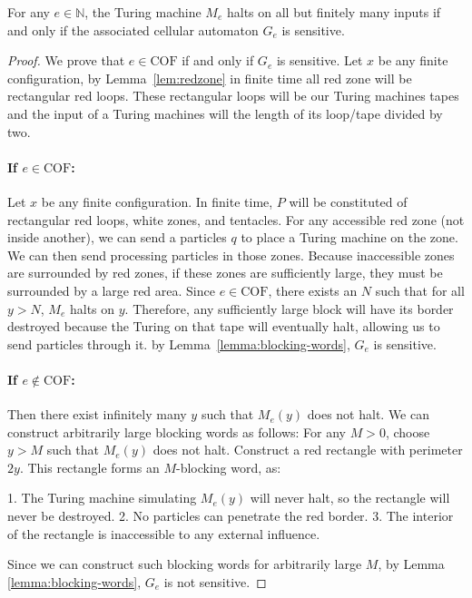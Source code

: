 \documentclass{llncs}
\begin{document}
\begin{lemma}\label{lemma:2Dhard}
For any $e \in \mathbb{N}$, the Turing machine $M_e$ halts on all but finitely many inputs if and only if the associated cellular automaton $G_e$ is sensitive.   
\end{lemma}

\begin{proof}
We prove that $e \in \text{COF}$ if and only if $G_e$ is sensitive. Let $x$ be any finite configuration, by Lemma~\ref{lem:redzone} in finite time all red zone will be rectangular red loops. These rectangular loops will be our Turing machines tapes and the input of a Turing machines will the length of its loop/tape divided by two. 

\paragraph{If $e \in \text{COF}$:} Let $x$ be any finite configuration. In finite time, $P$ will be constituted of rectangular red loops, white zones, and tentacles. For any accessible red zone (not inside another), we can send a particles $q$ to place a Turing machine on the zone. We can then send processing particles in those zones. Because inaccessible zones are surrounded by red zones, if these zones are sufficiently large, they must be surrounded by a large red area. Since $e \in \text{COF}$, there exists an $N$ such that for all $y > N$, $M_e$ halts on $y$. Therefore, any sufficiently large block will have its border destroyed because the Turing on that tape will eventually halt, allowing us to send particles through it. by Lemma~\ref{lemma:blocking-words}, $G_e$ is sensitive.




\paragraph{If $e \notin \text{COF}$:} Then there exist infinitely many $y$ such that $M_e(y)$ does not halt. We can construct arbitrarily large blocking words as follows: For any $M > 0$, choose $y > M$ such that $M_e(y)$ does not halt. Construct a red rectangle with perimeter $2y$. This rectangle forms an $M$-blocking word, as:


1. The Turing machine simulating $M_e(y)$ will never halt, so the rectangle will never be destroyed.
2. No particles can penetrate the red border.
3. The interior of the rectangle is inaccessible to any external influence.

Since we can construct such blocking words for arbitrarily large $M$, by Lemma \ref{lemma:blocking-words}, $G_e$ is not sensitive.

\end{proof}
\end{document}
